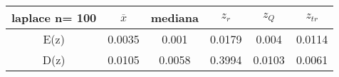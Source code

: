\begin{tabular}{|c|c|c|c|c|c|}
\hline
laplace n= 100& $\overline{x}$ & mediana & $z_r$ & $z_Q$ & $z_{tr}$ \\ \hline
E(z) & 0.0035 & 0.001 & 0.0179 & 0.004 & 0.0114 \\ \hline
D(z) & 0.0105 & 0.0058 & 0.3994 & 0.0103 & 0.0061 \\ \hline
\end{tabular}